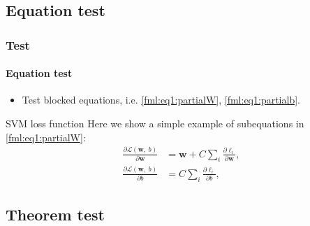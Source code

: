 \documentclass[aspectratio=169,hyperref={implicit=true}]{beamer}
\begin{document}
\subsection{Equation test}

\begin{frame}

\frametitle{Test}
\framesubtitle{Equation test}

\begin{itemize}
  \item Test blocked equations, i.e. \eqref{fml:eq1:partialW}, \eqref{fml:eq1:partialb}.
\end{itemize}

\begin{block}{SVM loss function} \label{blc:eq1}
  Here we show a simple example of subequations in \eqref{fml:eq1:partialW}:
  \begin{subequations}
    \renewcommand{\theequation}
    {\theparentequation-\arabic{equation}}
    \begin{align}
    \frac{\partial \mathcal{L}(\mathbf{w},~b)}{\partial \mathbf{w}} &= \mathbf{w} + C \sum\limits_i\frac{\partial \ell_i}{\partial \mathbf{w}}, \label{fml:eq1:partialW}\\
    \frac{\partial \mathcal{L}(\mathbf{w},~b)}{\partial b} &= C \sum\limits_i\frac{\partial \ell_i}{\partial b}, \label{fml:eq1:partialb}
    \end{align}
  \end{subequations}
\end{block}

\end{frame}

\subsection{Theorem test}
\end{document}
